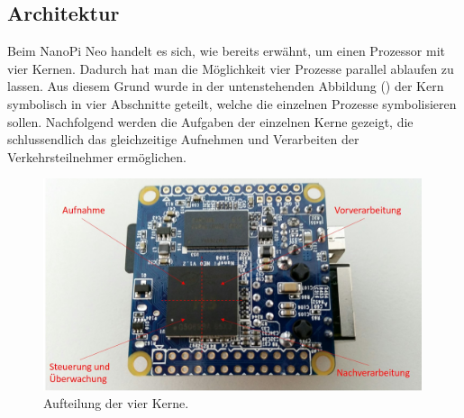 \subsection{Architektur}
Beim NanoPi Neo handelt es sich, wie bereits erwähnt, um einen Prozessor mit vier Kernen. Dadurch hat man die Möglichkeit vier Prozesse parallel ablaufen zu lassen. Aus diesem Grund wurde in der untenstehenden Abbildung () der Kern symbolisch in vier Abschnitte geteilt, welche die einzelnen Prozesse symbolisieren sollen. Nachfolgend werden die Aufgaben der einzelnen Kerne gezeigt, die schlussendlich das gleichzeitige Aufnehmen und Verarbeiten der Verkehrsteilnehmer ermöglichen.

\begin{figure}[H]
  \centering
  \includegraphics[width=0.99\textwidth]{Software/Architektur.jpg} 
  \caption{Aufteilung der vier Kerne.}
  \label{bArchitektur}
\end{figure}

